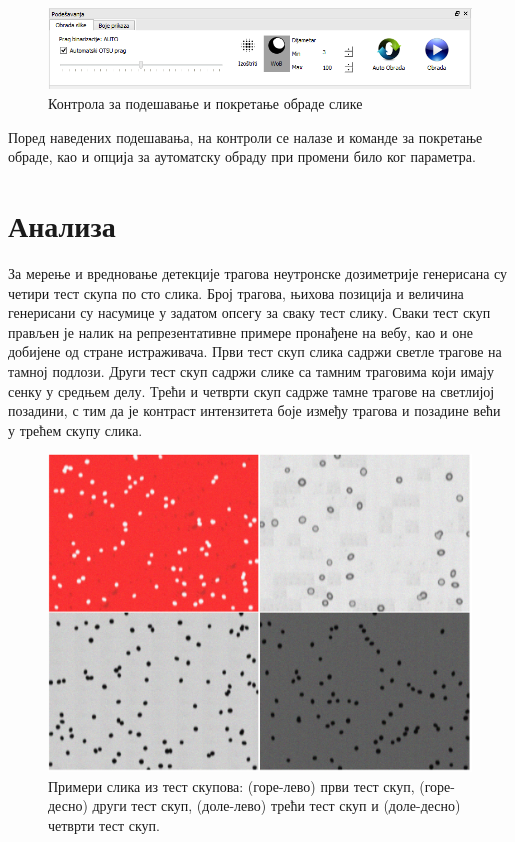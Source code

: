 \documentclass[11pt,a4paper,serbian,oneside]{book}
\begin{document}
\begin{figure}[H]
\begin{center}
\includegraphics[width=150mm]{images/processing.png}
\end{center}
\caption{Контрола за подешавање и покретање обраде слике}
\label{fig:processing}
\end{figure}

Поред наведених подешавања, на контроли се налазе и команде за покретање обраде, као и опција за аутоматску обраду при промени било ког параметра.

%
%
%

\chapter{Анализа}

За мерење и вредновање детекције трагова неутронске дозиметрије генерисана су четири тест скупа по сто слика. Број трагова, њихова позиција и величина генерисани су насумице у задатом опсегу за сваку тест слику. Сваки тест скуп прављен је налик на репрезентативне примере пронађене на вебу, као и оне добијене од стране истраживача. Први тест скуп слика садржи светле трагове на тамној подлози. Други тест скуп садржи слике са тамним траговима који имају сенку у средњем делу. Трећи и четврти скуп садрже тамне трагове на светлијој позадини, с тим да је контраст интензитета боје између трагова и позадине већи у трећем скупу слика.

\begin{figure}[h]
\begin{center}
\includegraphics[width=150mm]{images/test.png}
\end{center}
\caption{Примери слика из тест скупова: (горе-лево) први тест скуп, (горе-десно) други тест скуп, (доле-лево) трећи тест скуп и (доле-десно) четврти тест скуп.}
\label{fig:test}
\end{figure}
\end{document}

